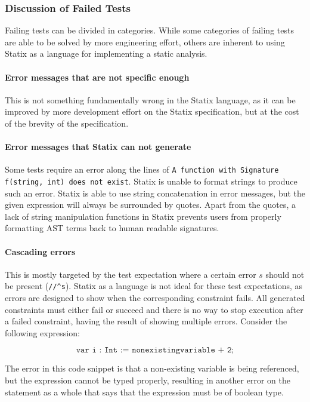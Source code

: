     \subsubsection{Discussion of Failed Tests}

      Failing tests can be divided in categories. While some categories of failing tests are able to be solved by more engineering effort, others are inherent to using Statix as a language for implementing a static analysis.

      \paragraph{Error messages that are not specific enough} This is not something fundamentally wrong in the Statix language, as it can be improved by more development effort on the Statix specification, but at the cost of the brevity of the specification.

      \paragraph{Error messages that Statix can not generate} Some tests require an error along the lines of \texttt{A function with Signature f(string, int) does not exist}. Statix is unable to format strings to produce such an error. Statix is able to use string concatenation in error messages, but the given expression will always be surrounded by quotes. Apart from the quotes, a lack of string manipulation functions in Statix prevents users from properly formatting AST terms back to human readable signatures.

      \paragraph{Cascading errors} This is mostly targeted by the test expectation where a certain error $s$ should not be present (\texttt{//\^{}s}). Statix as a language is not ideal for these test expectations, as errors are designed to show when the corresponding constraint fails. All generated constraints must either fail or succeed and there is no way to stop execution after a failed constraint, having the result of showing multiple errors. Consider the following expression:
      
      $$\texttt{var i : Int := nonexistingvariable + 2;}$$
      
      The error in this code snippet is that a non-existing variable is being referenced, but the expression cannot be typed properly, resulting in another error on the statement as a whole that says that the expression must be of boolean type.
      
